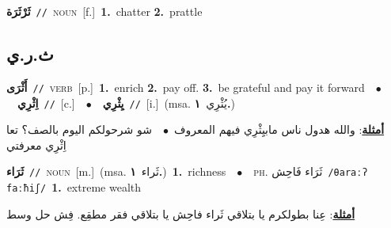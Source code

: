 \documentclass[10pt,a4paper,twoside]{article} %
\begin{document}
\begin{multicols}{2}
{\setlength\topsep{0pt}\textbf{\foreignlanguage{arabic}{ثَرْثَرَة}}\ {\color{gray}\texttt{//}\color{black}}\ \textsc{noun}\ [f.]\ \textbf{1.}~chatter  \textbf{2.}~prattle\ } \vspace{2mm}

\vspace{-3mm}
\subsection*{\color{blue}\foreignlanguage{arabic}{ث.ر.ي}\color{blue}{}} 

{\setlength\topsep{0pt}\textbf{\foreignlanguage{arabic}{أَثْرَى}}\ {\color{gray}\texttt{//}\color{black}}\ \textsc{verb}\ [p.]\ \textbf{1.}~enrich  \textbf{2.}~pay off.  \textbf{3.}~be grateful and pay it forward\ \ $\bullet$\ \ \setlength\topsep{0pt}\textbf{\foreignlanguage{arabic}{اِثْرِي}}\ {\color{gray}\texttt{//}\color{black}}\ [c.]\ \ $\bullet$\ \ \setlength\topsep{0pt}\textbf{\foreignlanguage{arabic}{يِثْرِي}}\ {\color{gray}\texttt{//}\color{black}}\ [i.]\ \color{gray}(msa. \foreignlanguage{arabic}{يُثْرِي}~\foreignlanguage{arabic}{\textbf{١.}})\color{black}\  \begin{flushright}\color{gray}\foreignlanguage{arabic}{\textbf{\underline{\foreignlanguage{arabic}{أمثلة}}}: والله هدول ناس مابيِثْرِي فيهم المعروف\ $\bullet$\ \  شو شرحولكم اليوم بالصف؟ تعا اِثْرِي معرفتي}\end{flushright}\color{black}} \vspace{2mm}

{\setlength\topsep{0pt}\textbf{\foreignlanguage{arabic}{ثَرَاء}}\ {\color{gray}\texttt{//}\color{black}}\ \textsc{noun}\ [m.]\ \color{gray}(msa. \foreignlanguage{arabic}{ثَراء}~\foreignlanguage{arabic}{\textbf{١.}})\color{black}\ \textbf{1.}~richness\ \ $\bullet$\ \ \textsc{ph.} \color{gray} \foreignlanguage{arabic}{ثَرَاء فَاحِش}\color{black}\ {\color{gray}\texttt{/{\sffamily θaraːʔ faːħiʃ}/}\color{black}}\ \textbf{1.}~extreme wealth\  \begin{flushright}\color{gray}\foreignlanguage{arabic}{\textbf{\underline{\foreignlanguage{arabic}{أمثلة}}}: عِنا بطولكرم يا بتلاقي ثَراء فاحِش يا بتلاقي فقر مطقِع. فِش حل وسط}\end{flushright}\color{black}} \vspace{2mm}


\end{multicols}
\end{document}
